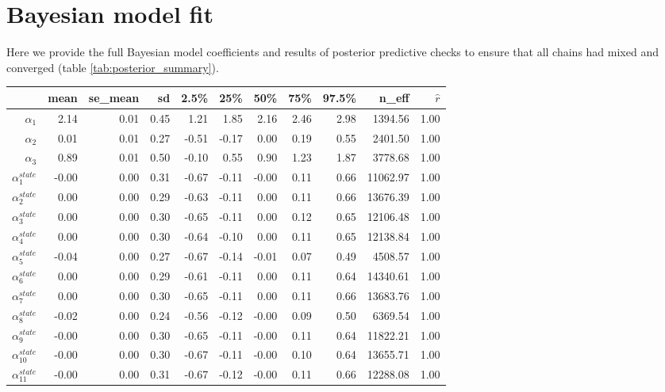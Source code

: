 \documentclass[12pt,english,a4paper]{article}
\begin{document}
\section{Bayesian model fit}

Here we provide the full Bayesian model coefficients and results of posterior predictive checks to ensure that all chains had mixed and converged (table \ref{tab:posterior_summary}).

\begin{table}[ht]
\centering
\tiny
\begin{tabular}{rrrrrrrrrrr}
  \hline
 & mean & se\_mean & sd & 2.5\% & 25\% & 50\% & 75\% & 97.5\% & n\_eff & $\hat{r}$ \\ 
  \hline
  $\alpha_1$ & 2.14 & 0.01 & 0.45 & 1.21 & 1.85 & 2.16 & 2.46 & 2.98 & 1394.56 & 1.00 \\ 
  $\alpha_2$ & 0.01 & 0.01 & 0.27 & -0.51 & -0.17 & 0.00 & 0.19 & 0.55 & 2401.50 & 1.00 \\ 
  $\alpha_3$ & 0.89 & 0.01 & 0.50 & -0.10 & 0.55 & 0.90 & 1.23 & 1.87 & 3778.68 & 1.00 \\ 
  $\alpha_1^{state}$ & -0.00 & 0.00 & 0.31 & -0.67 & -0.11 & -0.00 & 0.11 & 0.66 & 11062.97 & 1.00 \\ 
  $\alpha_2^{state}$ & 0.00 & 0.00 & 0.29 & -0.63 & -0.11 & 0.00 & 0.11 & 0.66 & 13676.39 & 1.00 \\ 
  $\alpha_3^{state}$ & 0.00 & 0.00 & 0.30 & -0.65 & -0.11 & 0.00 & 0.12 & 0.65 & 12106.48 & 1.00 \\ 
  $\alpha_4^{state}$ & 0.00 & 0.00 & 0.30 & -0.64 & -0.10 & 0.00 & 0.11 & 0.65 & 12138.84 & 1.00 \\ 
  $\alpha_5^{state}$ & -0.04 & 0.00 & 0.27 & -0.67 & -0.14 & -0.01 & 0.07 & 0.49 & 4508.57 & 1.00 \\ 
  $\alpha_6^{state}$ & 0.00 & 0.00 & 0.29 & -0.61 & -0.11 & 0.00 & 0.11 & 0.64 & 14340.61 & 1.00 \\ 
  $\alpha_7^{state}$ & 0.00 & 0.00 & 0.30 & -0.65 & -0.11 & 0.00 & 0.11 & 0.66 & 13683.76 & 1.00 \\ 
  $\alpha_8^{state}$ & -0.02 & 0.00 & 0.24 & -0.56 & -0.12 & -0.00 & 0.09 & 0.50 & 6369.54 & 1.00 \\ 
  $\alpha_9^{state}$ & -0.00 & 0.00 & 0.30 & -0.65 & -0.11 & -0.00 & 0.11 & 0.64 & 11822.21 & 1.00 \\ 
  $\alpha_{10}^{state}$ & -0.00 & 0.00 & 0.30 & -0.67 & -0.11 & -0.00 & 0.10 & 0.64 & 13655.71 & 1.00 \\ 
  $\alpha_{11}^{state}$ & -0.00 & 0.00 & 0.31 & -0.67 & -0.12 & -0.00 & 0.11 & 0.66 & 12288.08 & 1.00 \\ 

\end{tabular}
\end{table}
\end{document}
